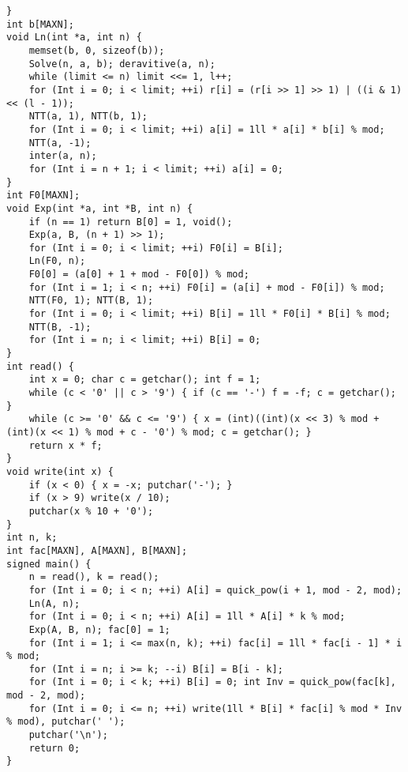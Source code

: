 \begin{verbatim}
}
int b[MAXN];
void Ln(int *a, int n) {
    memset(b, 0, sizeof(b));
    Solve(n, a, b); deravitive(a, n);
    while (limit <= n) limit <<= 1, l++;
    for (Int i = 0; i < limit; ++i) r[i] = (r[i >> 1] >> 1) | ((i & 1) << (l - 1));
    NTT(a, 1), NTT(b, 1);
    for (Int i = 0; i < limit; ++i) a[i] = 1ll * a[i] * b[i] % mod;
    NTT(a, -1);
    inter(a, n);
    for (Int i = n + 1; i < limit; ++i) a[i] = 0;
}
int F0[MAXN];
void Exp(int *a, int *B, int n) {
    if (n == 1) return B[0] = 1, void();
    Exp(a, B, (n + 1) >> 1);
    for (Int i = 0; i < limit; ++i) F0[i] = B[i];
    Ln(F0, n);
    F0[0] = (a[0] + 1 + mod - F0[0]) % mod;
    for (Int i = 1; i < n; ++i) F0[i] = (a[i] + mod - F0[i]) % mod;
    NTT(F0, 1); NTT(B, 1);
    for (Int i = 0; i < limit; ++i) B[i] = 1ll * F0[i] * B[i] % mod;
    NTT(B, -1);
    for (Int i = n; i < limit; ++i) B[i] = 0;
}
int read() {
    int x = 0; char c = getchar(); int f = 1;
    while (c < '0' || c > '9') { if (c == '-') f = -f; c = getchar(); }
    while (c >= '0' && c <= '9') { x = (int)((int)(x << 3) % mod + (int)(x << 1) % mod + c - '0') % mod; c = getchar(); }
    return x * f;
}
void write(int x) {
    if (x < 0) { x = -x; putchar('-'); }
    if (x > 9) write(x / 10);
    putchar(x % 10 + '0');
}
int n, k;
int fac[MAXN], A[MAXN], B[MAXN];
signed main() {
    n = read(), k = read();
    for (Int i = 0; i < n; ++i) A[i] = quick_pow(i + 1, mod - 2, mod);
    Ln(A, n);
    for (Int i = 0; i < n; ++i) A[i] = 1ll * A[i] * k % mod;
    Exp(A, B, n); fac[0] = 1;
    for (Int i = 1; i <= max(n, k); ++i) fac[i] = 1ll * fac[i - 1] * i % mod;
    for (Int i = n; i >= k; --i) B[i] = B[i - k];
    for (Int i = 0; i < k; ++i) B[i] = 0; int Inv = quick_pow(fac[k], mod - 2, mod);
    for (Int i = 0; i <= n; ++i) write(1ll * B[i] * fac[i] % mod * Inv % mod), putchar(' ');
    putchar('\n');
    return 0;
}
\end{verbatim}

